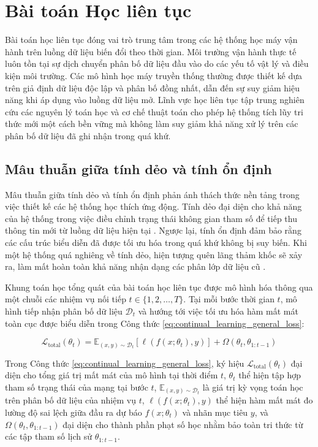 \section{Bài toán Học liên tục}

Bài toán học liên tục đóng vai trò trung tâm trong các hệ thống học máy vận hành trên luồng dữ liệu biến đổi theo thời gian. Môi trường vận hành thực tế luôn tồn tại sự dịch chuyển phân bố dữ liệu đầu vào do các yếu tố vật lý và điều kiện môi trường. Các mô hình học máy truyền thống thường được thiết kế dựa trên giả định dữ liệu độc lập và phân bố đồng nhất, dẫn đến sự suy giảm hiệu năng khi áp dụng vào luồng dữ liệu mở. Lĩnh vực học liên tục tập trung nghiên cứu các nguyên lý toán học và cơ chế thuật toán cho phép hệ thống tích lũy tri thức mới một cách bền vững mà không làm suy giảm khả năng xử lý trên các phân bố dữ liệu đã ghi nhận trong quá khứ.

\subsection{Mâu thuẫn giữa tính dẻo và tính ổn định}

Mâu thuẫn giữa tính dẻo và tính ổn định phản ánh thách thức nền tảng trong việc thiết kế các hệ thống học thích ứng động. Tính dẻo đại diện cho khả năng của hệ thống trong việc điều chỉnh trạng thái không gian tham số để tiếp thu thông tin mới từ luồng dữ liệu hiện tại \cite{grossberg1987competitive}. Ngược lại, tính ổn định đảm bảo rằng các cấu trúc biểu diễn đã được tối ưu hóa trong quá khứ không bị suy biến. Khi một hệ thống quá nghiêng về tính dẻo, hiện tượng quên lãng thảm khốc sẽ xảy ra, làm mất hoàn toàn khả năng nhận dạng các phân lớp dữ liệu cũ \cite{french1999catastrophic}.

Khung toán học tổng quát của bài toán học liên tục được mô hình hóa thông qua một chuỗi các nhiệm vụ nối tiếp $t \in \{1, 2, \dots, T\}$. Tại mỗi bước thời gian $t$, mô hình tiếp nhận phân bố dữ liệu $\mathcal{D}_t$ và hướng tới việc tối ưu hóa hàm mất mát toàn cục được biểu diễn trong Công thức \ref{eq:continual_learning_general_loss}:

\begin{equation}
\mathcal{L}_{\text{total}}(\theta_t) = \mathbb{E}_{(x, y) \sim \mathcal{D}_t} \left[ \ell(f(x; \theta_t), y) \right] + \Omega(\theta_t, \theta_{1:t-1})
\label{eq:continual_learning_general_loss}
\end{equation}

Trong Công thức \ref{eq:continual_learning_general_loss}, ký hiệu $\mathcal{L}_{\text{total}}(\theta_t)$ đại diện cho tổng giá trị mất mát của mô hình tại thời điểm $t$, $\theta_t$ thể hiện tập hợp tham số trạng thái của mạng tại bước $t$, $\mathbb{E}_{(x,y) \sim \mathcal{D}_t}$ là giá trị kỳ vọng toán học trên phân bố dữ liệu của nhiệm vụ $t$, $\ell(f(x; \theta_t), y)$ thể hiện hàm mất mát đo lường độ sai lệch giữa đầu ra dự báo $f(x; \theta_t)$ và nhãn mục tiêu $y$, và $\Omega(\theta_t, \theta_{1:t-1})$ đại diện cho thành phần phạt số học nhằm bảo toàn tri thức từ các tập tham số lịch sử $\theta_{1:t-1}$.

